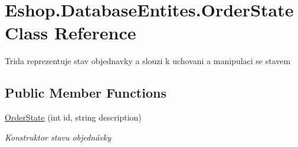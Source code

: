 \hypertarget{class_eshop_1_1_database_entites_1_1_order_state}{}\section{Eshop.\+Database\+Entites.\+Order\+State Class Reference}
\label{class_eshop_1_1_database_entites_1_1_order_state}


Trida reprezentuje stav objednavky a slouzi k uchovani a manipulaci se stavem  


\subsection*{Public Member Functions}
\begin{DoxyCompactItemize}
\item 
\mbox{\hyperlink{class_eshop_1_1_database_entites_1_1_order_state_aaa3a6722e949db5d7ced3fa2dec0ec29}{Order\+State}} (int id, string description)
\begin{DoxyCompactList}\small\item\em Konstruktor stavu objednávky \end{DoxyCompactList}\end{DoxyCompactItemize}
